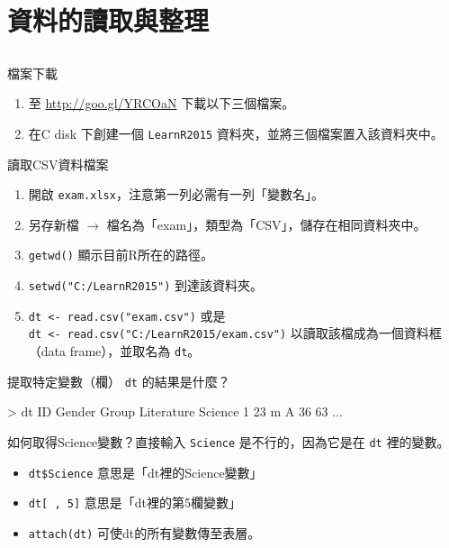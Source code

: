 \documentclass[14pt, aspectratio=43]{beamer}
\begin{document}
\section{資料的讀取與整理}\subsection{}


\begin{frame}[fragile]{檔案下載}
\begin{enumerate}
\item 至 \url{http://goo.gl/YRCOaN} 下載以下三個檔案。

\item 在C disk 下創建一個 \verb+LearnR2015+ 資料夾，並將三個檔案置入該資料夾中。
\end{enumerate}
\end{frame}


\begin{frame}[fragile]{讀取CSV資料檔案}
\begin{enumerate}
\item 開啟 \verb+exam.xlsx+，注意第一列必需有一列「變數名」。
\item 另存新檔 $\rightarrow$ 檔名為「exam」，類型為「CSV」，儲存在相同資料夾中。
\item \verb+getwd()+ 顯示目前R所在的路徑。
\item \verb+setwd("C:/LearnR2015")+ 到達該資料夾。
\item \verb+dt <- read.csv("exam.csv")+ 或是 \\
      \verb+dt <- read.csv("C:/LearnR2015/exam.csv")+ 以讀取該檔成為一個資料框（data frame），並取名為 \verb+dt+。\\
\end{enumerate}
\end{frame}


\begin{frame}[fragile]{提取特定變數（欄）}
\verb+dt+ 的結果是什麼？
\begin{R}
> dt
  ID Gender Group Literature Science
1 23      m     A         36      63
...
\end{R}

如何取得Science變數？直接輸入 \verb+Science+ 是不行的，因為它是在 \verb+dt+ 裡的變數。
\begin{itemize}
\item \verb+dt$Science+ 意思是「dt裡的Science變數」
\item \verb+dt[ , 5]+ 意思是「dt裡的第5欄變數」
\item \verb+attach(dt)+ 可使dt的所有變數傳至表層。
\end{itemize}
\end{frame}
\end{document}
